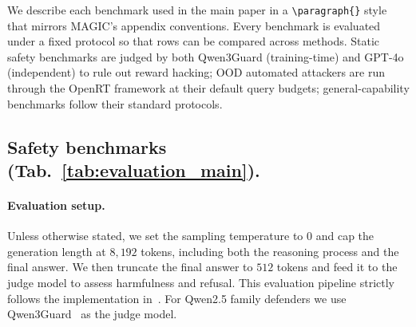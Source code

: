 \documentclass{article}
\begin{document}
We describe each benchmark used in the main paper in a \texttt{\textbackslash paragraph\{\}} style that mirrors MAGIC's appendix conventions. Every benchmark is evaluated under a fixed protocol so that rows can be compared across methods. Static safety benchmarks are judged by both Qwen3Guard (training-time) and GPT-4o (independent) to rule out reward hacking; OOD automated attackers are run through the OpenRT framework at their default query budgets; general-capability benchmarks follow their standard protocols.

\subsection{Safety benchmarks (Tab.~\ref{tab:evaluation_main}).}
\label{apdx:bench-safety}

\paragraph{Evaluation setup.} Unless otherwise stated, we set the sampling temperature to $0$ and cap the generation length at $8{,}192$ tokens, including both the reasoning process and the final answer. We then truncate the final answer to $512$ tokens and feed it to the judge model to assess harmfulness and refusal. This evaluation pipeline strictly follows the implementation in~\citet{liu2025chasing}. For Qwen2.5 family defenders we use Qwen3Guard~\citep{zhao2025qwen3guard} as the judge model.
\end{document}
